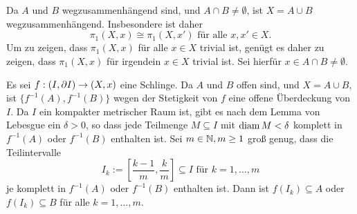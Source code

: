 \documentclass[a4paper,10pt]{article}
\begin{document}
\section{}


\subsection{}
Da $A$ und $B$ wegzusammenhängend sind, und $A \cap B \neq \emptyset$, ist $X = A \cup B$ wegzusammenhängend. Insbesondere ist daher
\[
 \pi_1(X,x) \cong \pi_1(X,x') \text{ für alle } x, x' \in X.
\]
Um zu zeigen, dass $\pi_1(X,x)$ für alle $x \in X$ trivial ist, genügt es daher zu zeigen, dass $\pi_1(X,x)$ für irgendein $x \in X$ trivial ist. Sei hierfür $x \in A \cap B \neq \emptyset$.

Es sei $f : (I, \partial I) \to (X,x)$ eine Schlinge. Da $A$ und $B$ offen sind, und $X = A \cup B$, ist $\{f^{-1}(A), f^{-1}(B)\}$ wegen der Stetigkeit von $f$ eine offene Überdeckung von $I$. Da $I$ ein kompakter metrischer Raum ist, gibt es nach dem Lemma von Lebesgue ein $\delta > 0$, so dass jede Teilmenge $M \subseteq I$ mit $\operatorname{diam} M < \delta$ komplett in $f^{-1}(A)$ oder $f^{-1}(B)$ enthalten ist. Sei $m \in \mathbb{N}, m \geq 1$ groß genug, dass die Teilintervalle
\[
 I_k := \left[ \frac{k-1}{m}, \frac{k}{m} \right] \subseteq I \text{ für } k = 1, \ldots, m
\]
je komplett in $f^{-1}(A)$ oder $f^{-1}(B)$ enthalten ist. Dann ist $f(I_k) \subseteq A$ oder $f(I_k) \subseteq B$ für alle $k = 1, \ldots, m$.
\end{document}
